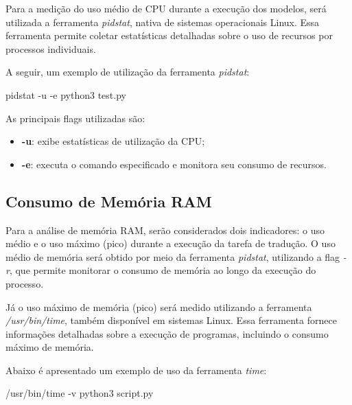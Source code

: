 Para a medição do uso médio de CPU durante a execução dos modelos, será utilizada a ferramenta \textit{pidstat}, nativa de sistemas operacionais Linux. Essa ferramenta permite coletar estatísticas detalhadas sobre o uso de recursos por processos individuais.

A seguir, um exemplo de utilização da ferramenta \textit{pidstat}:

\begin{listing}
\begin{python}
pidstat -u -e python3 test.py
\end{python}
\caption{Exemplo de uso da ferramenta \textit{pidstat}}
\label{code:pidstat}
\end{listing}

As principais flags utilizadas são:

\begin{itemize}
    \item \textbf{-u}: exibe estatísticas de utilização da CPU;
    \item \textbf{-e}: executa o comando especificado e monitora seu consumo de recursos.
\end{itemize}

\subsection{Consumo de Memória RAM}

Para a análise de memória RAM, serão considerados dois indicadores: o uso médio e o uso máximo (pico) durante a execução da tarefa de tradução. O uso médio de memória será obtido por meio da ferramenta \textit{pidstat}, utilizando a flag \textit{-r}, que permite monitorar o consumo de memória ao longo da execução do processo.

Já o uso máximo de memória (pico) será medido utilizando a ferramenta \textit{/usr/bin/time}, também disponível em sistemas Linux. Essa ferramenta fornece informações detalhadas sobre a execução de programas, incluindo o consumo máximo de memória.

Abaixo é apresentado um exemplo de uso da ferramenta \textit{time}:

\begin{listing}
\begin{python}
/usr/bin/time -v python3 script.py
\end{python}
\caption{Exemplo de uso da ferramenta \textit{time}}
\label{code:time}
\end{listing}

